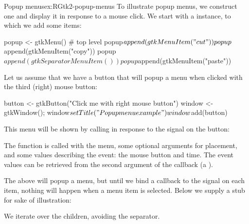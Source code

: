 \begin{example}{Popup menus}{ex:RGtk2-popup-menus}
To illustrate popup menus, we construct one and display it in response
to a mouse click. We start with a  instance, to which we
add some items:
\begin{Schunk}
\begin{Sinput}
 popup <- gtkMenu()                       # top level
 popup$append(gtkMenuItem("cut"))
 popup$append(gtkMenuItem("copy"))
 popup$append(gtkSeparatorMenuItem())
 popup$append(gtkMenuItem("paste"))
\end{Sinput}
\end{Schunk}

Let us assume that we have a button that will popup a menu when
clicked with the third (right) mouse button:
\begin{Schunk}
\begin{Sinput}
 button <- gtkButton("Click me with right mouse button")
 window <- gtkWindow(); window$setTitle("Popup menu example")
 window$add(button)
\end{Sinput}
\end{Schunk}

This menu will be shown by calling  in response to
the  signal on the button:
\begin{Schunk}
\end{Schunk}
%
The  function is called with the menu, some
optional arguments for placement, and some values describing the
event: the mouse button and time. The event values can be retrieved
from the second argument of the callback (a ).

The above will popup a menu, but until we bind a callback to the
 signal on each item, nothing will happen when a menu
item is selected. Below we supply a stub for sake of illustration:
\begin{Schunk}
\end{Schunk}
%
We iterate over the children, avoiding the separator.
\end{example}

